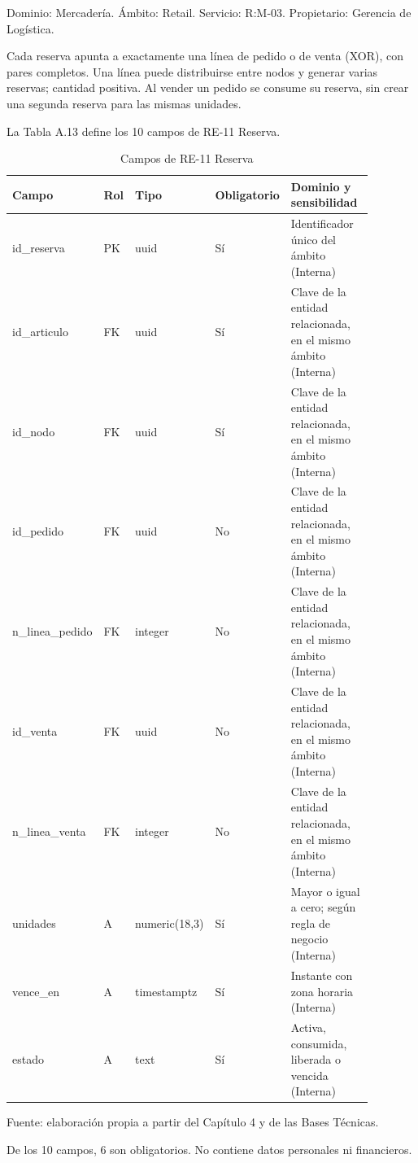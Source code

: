 \documentclass[11pt]{article}
\begin{document}
Dominio: Mercadería. Ámbito: Retail. Servicio: R:M-03. Propietario: Gerencia de Logística.

Cada reserva apunta a exactamente una línea de pedido o de venta (XOR), con pares completos. Una línea puede distribuirse entre nodos y generar varias reservas; cantidad positiva. Al vender un pedido se consume su reserva, sin crear una segunda reserva para las mismas unidades.

La Tabla A.13 define los 10 campos de RE-11 Reserva.

\begin{table}[htbp]
\caption{Campos de RE-11 Reserva}\label{tab:d_re11}
\centering
\begin{tabular}{@{}p{0.167\linewidth}p{0.070\linewidth}p{0.079\linewidth}p{0.097\linewidth}p{0.465\linewidth}@{}}
\toprule Campo & Rol & Tipo & Obligatorio & Dominio y sensibilidad \\
\midrule
id\_reserva & PK & uuid & Sí & Identificador único del ámbito (Interna) \\
id\_articulo & FK & uuid & Sí & Clave de la entidad relacionada, en el mismo ámbito (Interna) \\
id\_nodo & FK & uuid & Sí & Clave de la entidad relacionada, en el mismo ámbito (Interna) \\
id\_pedido & FK & uuid & No & Clave de la entidad relacionada, en el mismo ámbito (Interna) \\
n\_linea\_pedido & FK & integer & No & Clave de la entidad relacionada, en el mismo ámbito (Interna) \\
id\_venta & FK & uuid & No & Clave de la entidad relacionada, en el mismo ámbito (Interna) \\
n\_linea\_venta & FK & integer & No & Clave de la entidad relacionada, en el mismo ámbito (Interna) \\
unidades & A & numeric(18,3) & Sí & Mayor o igual a cero; según regla de negocio (Interna) \\
vence\_en & A & timestamptz & Sí & Instante con zona horaria (Interna) \\
estado & A & text & Sí & Activa, consumida, liberada o vencida (Interna) \\
\bottomrule
\end{tabular}
\par\smallskip
{\raggedright Fuente: elaboración propia a partir del Capítulo 4 y de las Bases Técnicas.\par}
\end{table}


De los 10 campos, 6 son obligatorios. No contiene datos personales ni financieros.
\end{document}
